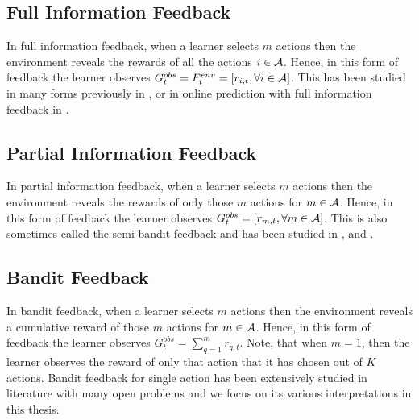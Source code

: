 \subsection{Full Information Feedback}
In full information feedback, when a learner selects $m$ actions then the environment reveals the rewards of all the actions $i\in \mathcal{A}$. Hence, in this form of feedback  the learner observes $G^{obs}_{t} = F^{env}_{t}=[r_{i,t},\forall i\in\mathcal{A}]$. This has been studied in many forms previously in \citet{takimoto2003path}, \citet{kalai2005efficient} or in online prediction with full information feedback in \citet{cesa2006prediction}.


\subsection{Partial Information Feedback}
In partial information feedback, when a learner selects $m$ actions then the environment reveals the rewards of only those $m$ actions for $m\in \mathcal{A}$. Hence, in this form of feedback  the learner observes $G^{obs}_{t} = [ r_{m,t},\forall m\in\mathcal{A} ]$. This is also sometimes called the semi-bandit feedback and has been studied in \citet{awerbuch2004adaptive},   \citet{mcmahan2004online} and \citet{gyorgy2007line}.


\subsection{Bandit Feedback}
In bandit feedback, when a learner selects $m$ actions then the environment reveals a cumulative reward of those $m$ actions for $m\in \mathcal{A}$. Hence, in this form of feedback  the learner observes $G^{obs}_{t} = \sum_{q=1}^{m} r_{q,t}$. Note, that when $m=1$, then the learner observes the reward of only that action that it has chosen out of $K$ actions. Bandit feedback for single action has been extensively studied in literature with many open problems and we focus on its various interpretations in this thesis.
